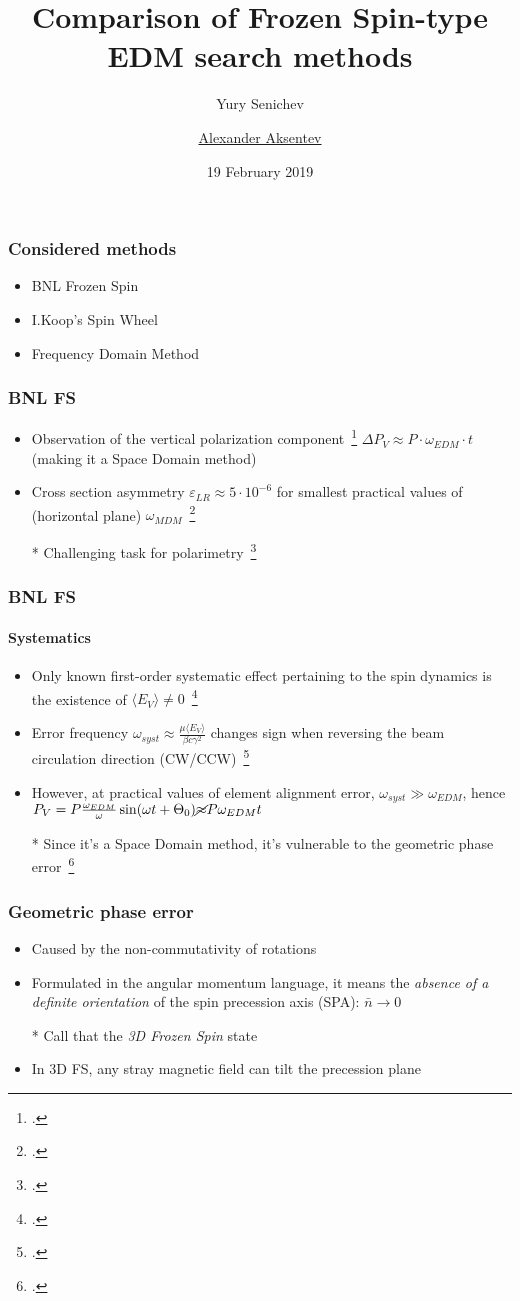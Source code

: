 \documentclass{beamer}
\title{Comparison of Frozen Spin-type EDM search methods}
\author[shortname]{Yury Senichev \inst{1} \and \underline{Alexander Aksentev} \inst{2,3}}
\institute[shortinst]{\inst{1} Institute for Nuclear Research of RAS \and%
  \inst{2} Forschungszentrum J\"ulich \and%
  \inst{3} NRNU ``MEPhI''
}
\date{19 February 2019}
\newcommand{\w}{\omega}
\newcommand{\avg}[1]{\langle{#1}\rangle}
\newcommand{\nbar}{\bar n}
\begin{document}
\begin{frame}
  \titlepage
\end{frame}

\begin{frame}\frametitle{Considered methods}
  \begin{itemize}
  \item BNL Frozen Spin
  \item I.Koop's Spin Wheel
  \item Frequency Domain Method
  \end{itemize}
\end{frame}

\begin{frame}\frametitle{BNL FS}
  \begin{itemize}
  \item Observation of the vertical polarization component~\footcite[p.~9]{BNL:Deuteron2008}
    $\Delta P_V \approx P\cdot\w_{EDM}\cdot t$ (making it a Space Domain method)
  \item Cross section asymmetry $\varepsilon_{LR}\approx 5\cdot 10^{-6}$ for
    smallest practical values of (horizontal plane) $\w_{MDM}$~\footcite[p.~18]{BNL:Deuteron2008}
  \item[*] Challenging task for polarimetry~\footcite[p.~6]{Mane:SpinWheel}
  \end{itemize}
\end{frame}

\begin{frame}\frametitle{BNL FS}\framesubtitle{Systematics}
  \begin{itemize}
  \item Only known first-order systematic effect pertaining to the spin dynamics is the existence of
    $\avg{E_V}\neq 0$~\footcite[p.~10]{BNL:Deuteron2008}
  \item Error frequency $\w_{syst} \approx \frac{\mu\avg{E_V}}{\beta c\gamma^2}$ changes sign when reversing
    the beam circulation direction (CW/CCW)~\footcite[p.~11]{BNL:Deuteron2008}
  \item However, at practical values of element alignment error, $\w_{syst} \gg \w_{EDM}$, hence
    $P_V = P\frac{\w_{EDM}}{\w}\sin(\w t + \Theta_0) \cancel{\approx}P\w_{EDM} t$
  \item[*] Since it's a Space Domain method, it's vulnerable to the geometric phase error~\footcite[p.~6]{BNL:Proton}
  \end{itemize}
\end{frame}

\begin{frame}\frametitle{Geometric phase error}
  \begin{itemize}
  \item Caused by the non-commutativity of rotations
  \item Formulated in the angular momentum language, it means the \emph{absence of a definite orientation} of
    the spin precession axis (SPA): $\nbar \rightarrow 0$
  \item[*] Call that the \emph{3D Frozen Spin} state
    \item In 3D FS, any stray magnetic field can tilt the precession plane
  \end{itemize}
\end{frame}
\end{document}
